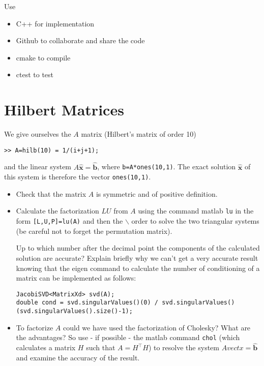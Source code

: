 \documentclass[12pt]{article}
\newcommand{\vect}[1]{\hat{\boldsymbol{#1}}}
\begin{document}
Use 
\begin{itemize}
    \item C++ for implementation
    \item Github to collaborate and share the code
    \item cmake to compile
    \item ctest to test
\end{itemize}


\section{Hilbert Matrices}

We give ourselves the $A$ matrix (Hilbert's matrix of order 10)
\begin{verbatim}
>> A=hilb(10) = 1/(i+j+1);
\end{verbatim}
and the linear system $A\vect{x}=\vect{b}$, where \verb|b=A*ones(10,1)|.
The exact solution $\vect{x}$ of this system is therefore the vector \verb|ones(10,1)|.

\begin{itemize}
    \item  Check that the matrix $A$ is symmetric and
of positive definition.
    \item Calculate the factorization $LU$ from $A$ using
the command matlab {\tt lu} in the form {\tt [L,U,P]=lu(A)} and then
the $\backslash$ order
to solve the two triangular systems (be careful not to
forget the permutation matrix).

Up to which number after the decimal point the components of  
the calculated solution are accurate? Explain briefly
why we can't get a very accurate result 
knowing that the eigen command to calculate the number of 
conditioning of a matrix can be implemented as follows:

\begin{verbatim}
JacobiSVD<MatrixXd> svd(A);
double cond = svd.singularValues()(0) / svd.singularValues()(svd.singularValues().size()-1);
\end{verbatim}

\item To factorize $A$ could we have used the
factorization of Cholesky? What are the advantages?
So use - if possible - the matlab command {\tt chol} (which calculates a matrix
$H$ such that $A=H^\top H$) to resolve the system $Avect{x}=\vect{b}$ and examine the accuracy of the result.

\end{itemize}
\end{document}
